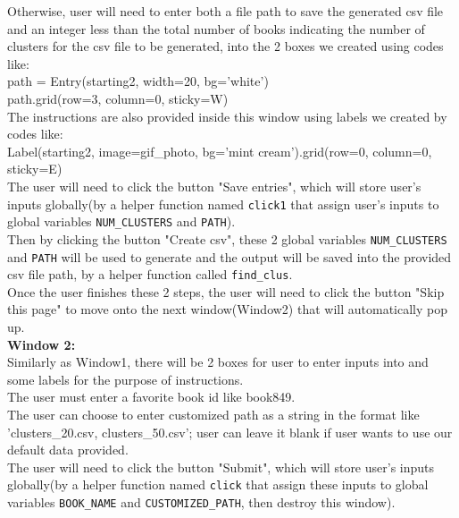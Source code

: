 \documentclass[fontsize=11pt]{article}
\begin{document}
Otherwise, user will need to enter both a file path to save the generated csv file and an integer less than the total number of books indicating the number of clusters for the csv file to be generated, into the 2 boxes we created using codes like:\\
path = Entry(starting2, width=20, bg='white')\\
path.grid(row=3, column=0, sticky=W)\\

The instructions are also provided inside this window using labels we created by codes like:\\
Label(starting2, image=gif\_photo, bg='mint cream').grid(row=0, column=0, sticky=E)\\

The user will need to click the button "Save entries", which will store user's inputs globally(by a helper function named \texttt{click1} that assign user's inputs to global variables \texttt{NUM\_CLUSTERS} and \texttt{PATH}). \\

Then by clicking the button "Create csv", these 2 global variables \texttt{NUM\_CLUSTERS} and \texttt{PATH} will be used to generate and the output will be saved into the provided csv file path, by a helper function called \texttt{find\_clus}. \\

Once the user finishes these 2 steps, the user will need to click the button "Skip this page" to move onto the next window(Window2) that will automatically pop up.\\

\textbf{Window 2:}\\

Similarly as Window1, there will be 2 boxes for user to enter inputs into and some labels for the purpose of instructions.\\

The user must enter a favorite book id like book849.\\

The user can choose to enter customized path as a string in the format like 'clusters\_20.csv, clusters\_50.csv'; user can leave it blank if user wants to  use our default data provided. \\

The user will need to click the button "Submit", which will store user's inputs globally(by a helper function named \texttt{click} that assign these inputs to global variables \texttt{BOOK\_NAME} and \texttt{CUSTOMIZED\_PATH}, then destroy this window).\\
\end{document}
